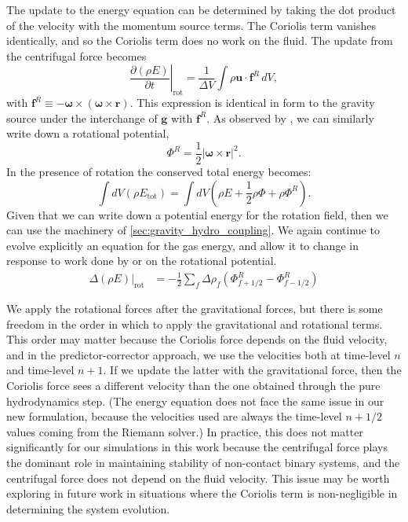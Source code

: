 \documentclass[12pt]{article}
\begin{document}
The update to the energy equation can be determined by taking the dot product of the velocity
with the momentum source terms. The Coriolis term vanishes identically, and so
the Coriolis term does no work on the fluid. The update from the centrifugal force becomes
\begin{equation}
  \left.\frac{\partial(\rho E)}{\partial t}\right|_{\text{rot}} = \frac{1}{\Delta V}\int \rho \mathbf{u} \cdot \mathbf{f}^R\, dV,
\end{equation}
with $\mathbf{f}^R \equiv  -{\bm\omega} \times \left({\bm\omega} \times \mathbf{r}\right)$. 
This expression is identical in form to the gravity source under the interchange of $\mathbf{g}$ with $\mathbf{f}^R$.
As observed by \cite{marcello:2012}, we can similarly write down a rotational potential,
\begin{equation}
  \Phi^R = \frac{1}{2} \left| {\bm\omega} \times \mathbf{r} \right|^2.
\end{equation}
In the presence of rotation the conserved total energy becomes:
\begin{equation}
  \int dV (\rho E_{\text{tot}}) = \int dV \left( \rho E + \frac{1}{2} \rho \Phi + \rho \Phi^R \right).
\end{equation}
Given that we can write down a potential energy for the rotation field, then we can use the machinery of 
\autoref{sec:gravity_hydro_coupling}. We again continue to evolve explicitly an equation for 
the gas energy, and allow it to change in response to work done by or on the rotational potential.
\begin{align}
  \left.\Delta(\rho E)\right|_{\text{rot}} &= -\frac{1}{2}\sum_{f} \Delta \rho_{f} (\Phi^R_{f+1/2} - \Phi^R_{f-1/2})
\end{align}

We apply the rotational forces after the gravitational forces, but 
there is some freedom in the order in which to apply the gravitational and rotational terms.
This order may matter because the Coriolis force depends on the fluid velocity, and 
in the predictor-corrector approach, we use the velocities both at 
time-level $n$ and time-level $n+1$. If we update the latter with the gravitational force, 
then the Coriolis force sees a different velocity than the one obtained through the 
pure hydrodynamics step. (The energy equation does not face the same issue in our new formulation,
because the velocities used are always the time-level $n+1/2$ values coming from the Riemann solver.)
In practice, this does not matter significantly for our simulations in this work 
because the centrifugal force plays the dominant role in maintaining stability of non-contact 
binary systems, and the centrifugal force does not depend on the fluid velocity.
This issue may be worth exploring in future work in situations where the Coriolis 
term is non-negligible in determining the system evolution.
\end{document}
